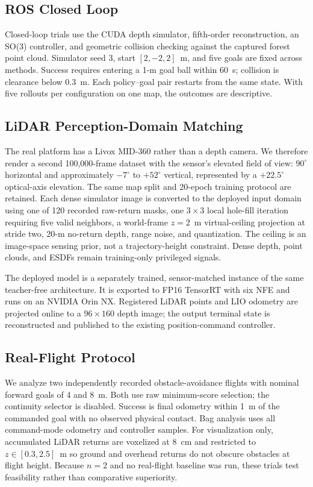 \subsection{ROS Closed Loop}

Closed-loop trials use the CUDA depth simulator, fifth-order reconstruction, an SO(3) controller, and geometric collision checking against the captured forest point cloud. Simulator seed 3, start $[2,-2,2]$~m, and five goals are fixed across methods. Success requires entering a 1-m goal ball within 60~s; collision is clearance below 0.3~m. Each policy--goal pair restarts from the same state. With five rollouts per configuration on one map, the outcomes are descriptive.

\subsection{LiDAR Perception-Domain Matching}

The real platform has a Livox MID-360 rather than a depth camera. We therefore render a second 100,000-frame dataset with the sensor's elevated field of view: $90^{\circ}$ horizontal and approximately $-7^{\circ}$ to $+52^{\circ}$ vertical, represented by a $+22.5^{\circ}$ optical-axis elevation. The same map split and 20-epoch training protocol are retained. Each dense simulator image is converted to the deployed input domain using one of 120 recorded raw-return masks, one $3\times3$ local hole-fill iteration requiring five valid neighbors, a world-frame $z=2$~m virtual-ceiling projection at stride two, 20-m no-return depth, range noise, and quantization. The ceiling is an image-space sensing prior, not a trajectory-height constraint. Dense depth, point clouds, and ESDFs remain training-only privileged signals.

The deployed model is a separately trained, sensor-matched instance of the same teacher-free architecture. It is exported to FP16 TensorRT with six NFE and runs on an NVIDIA Orin NX. Registered LiDAR points and LIO odometry are projected online to a $96\times160$ depth image; the output terminal state is reconstructed and published to the existing position-command controller.

\subsection{Real-Flight Protocol}

We analyze two independently recorded obstacle-avoidance flights with nominal forward goals of 4 and 8~m. Both use raw minimum-score selection; the continuity selector is disabled. Success is final odometry within 1~m of the commanded goal with no observed physical contact. Bag analysis uses all command-mode odometry and controller samples. For visualization only, accumulated LiDAR returns are voxelized at 8~cm and restricted to $z\in[0.3,2.5]$~m so ground and overhead returns do not obscure obstacles at flight height. Because $n=2$ and no real-flight baseline was run, these trials test feasibility rather than comparative superiority.
